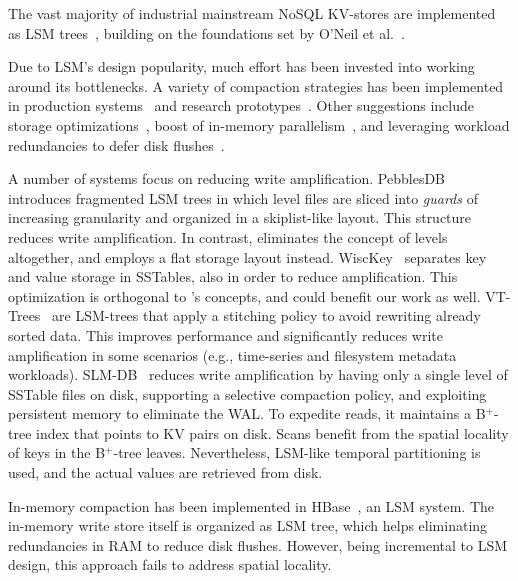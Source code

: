

The vast majority of industrial mainstream NoSQL KV-stores are  implemented as LSM trees~\cite{hbase, 
RocksDB, scylladb, Bigtable2008, cassandra2010}, building on the foundations set by O'Neil 
et al.~\cite{DBLP:journals/acta/ONeilCGO96, Muth1998}. 

Due to LSM's design popularity, much effort has been invested into working around its bottlenecks.
A variety of compaction strategies has been implemented in production systems~\cite{CallaghanCompaction, 
ScyllaCompaction} and research prototypes~\cite{triad, PebblesDB, vttrees, slmdb}. Other suggestions include storage
optimizations~\cite{WiscKey, PebblesDB, vttrees, slmdb}, boost of in-memory parallelism~\cite{scylladb, clsm2015}, and leveraging 
 workload redundancies to defer disk flushes~\cite{triad, accordion}. 

A number of systems focus on reducing write amplification.
PebblesDB~\cite{PebblesDB} introduces fragmented LSM trees in which level files are 
sliced into {\em guards\/} of increasing granularity and organized in a skiplist-like layout. This structure 
reduces write amplification. In contrast, \sys\/ eliminates the concept of levels altogether, 
and employs a flat storage layout instead. WiscKey~\cite{WiscKey} separates key and value storage 
in SSTables, also in order to reduce amplification. This optimization is orthogonal to \sys's concepts,
and could benefit our work as well. 
VT-Trees~\cite{vttrees} are LSM-trees that apply a stitching policy to avoid rewriting already sorted data. This improves performance and significantly reduces write amplification 
in some scenarios (e.g., time-series and filesystem metadata workloads). 
SLM-DB~\cite{slmdb} reduces write amplification by having only a single level of SSTable files on disk, supporting a selective compaction policy, and
exploiting persistent memory to eliminate the WAL. To expedite reads, it maintains a B$^+$-tree index that points to KV pairs on disk. Scans benefit from the spatial locality of keys in the B$^+$-tree leaves. Nevertheless, LSM-like temporal partitioning is used, and the actual values are retrieved from disk.

In-memory compaction has been implemented in HBase~\cite{accordion}, an LSM system.
The in-memory write store itself is organized as LSM tree, which helps eliminating redundancies 
in RAM to reduce disk flushes. However, being incremental to LSM design, 
this approach fails to address spatial locality. 

